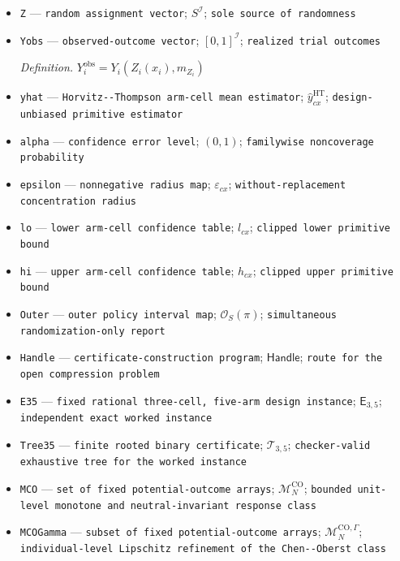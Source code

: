 \documentclass{article}
\begin{document}
\begin{itemize}
  \item \texttt{Z} --- \texttt{random assignment vector}; \(S^{\mathcal I}\); \texttt{sole source of randomness}
  \item \texttt{Yobs} --- \texttt{observed-\allowbreak{}outcome vector}; \([0,1]^{\mathcal I}\); \texttt{realized trial outcomes}
  \par\smallskip\noindent\emph{Definition.} \(Y_i^{\mathrm{obs}}=Y_i(Z_i(x_i),m_{Z_i})\)
  \item \texttt{yhat} --- \texttt{Horvitz-\allowbreak{}-\allowbreak{}Thompson arm-\allowbreak{}cell mean estimator}; \(\widehat y_{cx}^{\mathrm{HT}}\); \texttt{design-\allowbreak{}unbiased primitive estimator}
  \item \texttt{alpha} --- \texttt{confidence error level}; \((0,1)\); \texttt{familywise noncoverage probability}
  \item \texttt{epsilon} --- \texttt{nonnegative radius map}; \(\varepsilon_{cx}\); \texttt{without-\allowbreak{}replacement concentration radius}
  \item \texttt{lo} --- \texttt{lower arm-\allowbreak{}cell confidence table}; \(l_{cx}\); \texttt{clipped lower primitive bound}
  \item \texttt{hi} --- \texttt{upper arm-\allowbreak{}cell confidence table}; \(h_{cx}\); \texttt{clipped upper primitive bound}
  \item \texttt{Outer} --- \texttt{outer policy interval map}; \(\mathcal O_S(\pi)\); \texttt{simultaneous randomization-\allowbreak{}only report}
  \item \texttt{Handle} --- \texttt{certificate-\allowbreak{}construction program}; \(\mathsf{Handle}\); \texttt{route for the open compression problem}
  \item \texttt{E35} --- \texttt{fixed rational three-\allowbreak{}cell,\allowbreak{} five-\allowbreak{}arm design instance}; \(\mathsf E_{3,5}\); \texttt{independent exact worked instance}
  \item \texttt{Tree35} --- \texttt{finite rooted binary certificate}; \(\mathcal T_{3,5}\); \texttt{checker-\allowbreak{}valid exhaustive tree for the worked instance}
  \item \texttt{MCO} --- \texttt{set of fixed potential-\allowbreak{}outcome arrays}; \(\mathcal M_N^{\mathrm{CO}}\); \texttt{bounded unit-\allowbreak{}level monotone and neutral-\allowbreak{}invariant response class}
  \item \texttt{MCOGamma} --- \texttt{subset of fixed potential-\allowbreak{}outcome arrays}; \(\mathcal M_N^{\mathrm{CO},\Gamma}\); \texttt{individual-\allowbreak{}level Lipschitz refinement of the Chen-\allowbreak{}-\allowbreak{}Oberst class}

\end{itemize}
\end{document}
